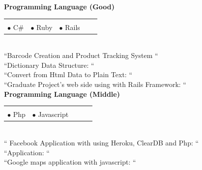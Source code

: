 \documentclass[10pt,a4paper]{article}
\begin{document}
{\bf Programming Language (Good)}\\
\hspace*{0.3in}\begin{tabular}{lrrrr}
\vspace{0.5 mm}\\
  $\bullet$ C$ \# $ &$\bullet$ Ruby &$\bullet$ Rails & &\\
\end{tabular}
\vspace{0.5 mm}\\
\hspace*{0.6in}\footnotesize{``Barcode Creation and Product Tracking System ``}\\
\hspace*{0.6in}\footnotesize{``Dictionary Data Structure: ``}\\
\hspace*{0.6in}\footnotesize{``Convert from Html Data to Plain Text: ``}\\
\hspace*{0.6in}\footnotesize{``Graduate Project's web side using with Rails Framework: ``}\\

{\bf Programming Language (Middle)}\\
\hspace*{0.3in}\begin{tabular}{lrrrr}
\vspace{0.5 mm}\\
  $\bullet$ Php &$\bullet$ Javascript & & &\\
\end{tabular}
\vspace{0.5 mm}\\
\hspace*{0.6in}\footnotesize{`` Facebook Application with using Heroku, ClearDB and Php: ``}\\
\hspace*{0.6in}\footnotesize{``Application: ``}\\
\hspace*{0.6in}\footnotesize{``Google maps application with javascript: ``}\\
\end{document}
